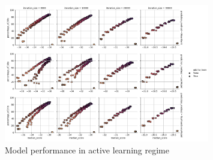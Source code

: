 \begin{figure}[h]
\centering
\includegraphics[width=0.8\textwidth]{figures/Figure_3.png}
\caption{Model performance in active learning regime}
\label{fig:fig_3}
\end{figure}

